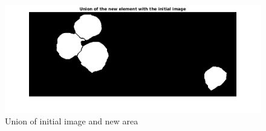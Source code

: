 \begin{figure}
	\begin{center}
		\centering
		\includegraphics[scale=0.5]{img/final/finalresult.png}
		\caption{Union of initial image and new area}
		\label{fig:unionimage}
	\end{center}
\end{figure}
